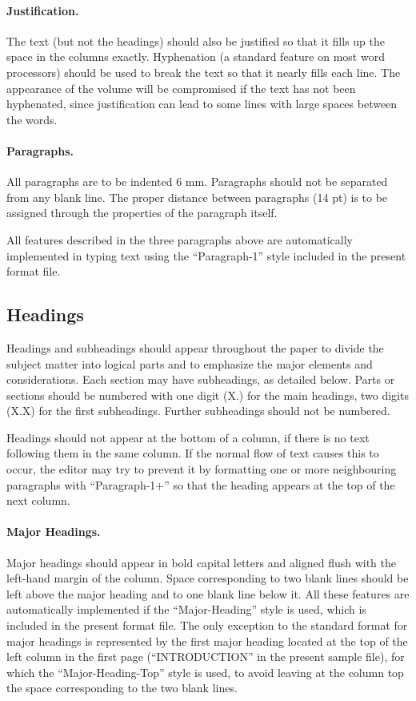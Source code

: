 \documentclass{stabs21}
\begin{document}
\begin{multicols}{2}
\paragraph{Justification.}

The text (but not the headings) should also be justified so that it
fills up the space in the columns exactly. Hyphenation (a standard
feature on most word processors) should be used to break the text so
that it nearly fills each line. The appearance of the volume will be
compromised if the text has not been hyphenated, since justification
can lead to some lines with large spaces between the words.

\paragraph{Paragraphs.}

All paragraphs are to be indented 6 mm. Paragraphs should not be
separated from any blank line. The proper distance between paragraphs
(14 pt) is to be assigned through the properties of the paragraph
itself.

All features described in the three paragraphs above are
automatically implemented in typing text using the ``Paragraph-1''
style included in the present format file.

\subsection{Headings}

Headings and subheadings should appear throughout the paper to divide
the subject matter into logical parts and to emphasize the major
elements and considerations. Each section may have subheadings, as
detailed below. Parts or sections should be numbered with one digit
(X.) for the main headings, two digits (X.X) for the first
subheadings. Further subheadings should not be numbered.

Headings should not appear at the bottom of a column, if there is no
text following them in the same column. If the normal flow of text
causes this to occur, the editor may try to prevent it by formatting
one or more neighbouring paragraphs with ``Paragraph-1+'' so that the
heading appears at the top of the next column.

\paragraph{Major Headings.}

Major headings should appear in bold capital letters and aligned flush
with the left-hand margin of the column. Space corresponding to two
blank lines should be left above the major heading and to one blank
line below it. All these features are automatically implemented if the
``Major-Heading'' style is used, which is included in the present
format file. The only exception to the standard format for major
headings is represented by the first major heading located at the top
of the left column in the first page (``INTRODUCTION'' in the present
sample file), for which the ``Major-Heading-Top'' style is used, to
avoid leaving at the column top the space corresponding to the two
blank lines.


\end{multicols}
\end{document}
